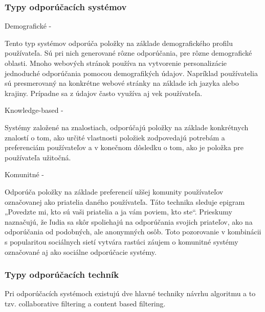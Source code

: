 \subsubsection{Typy odporúčacích systémov}
\begin{itemize}[leftmargin=*]
{\bf \item Demografické - }Tento typ systémov odporúča položky na základe demografického profilu používateľa. Sú pri nich generované rôzne odporúčania, pre rôzne demografické oblasti. Mnoho webových stránok používa na vytvorenie personalizácie jednoduché odporúčania pomocou demografikých údajov. Napríklad používatelia sú presmerovaný na konkrétne webové stránky na základe ich jazyka alebo krajiny. Prípadne sa z údajov často využíva aj vek používateľa.
{\bf \item Knowledge-based - }Systémy založené na znalostiach, odporúčajú položky na základe konkrétnych znalostí o tom, ako určité vlastnosti položiek zodpovedajú potrebám a preferenciám používateľov a v konečnom dôsledku o tom, ako je položka pre používateľa užitočná.
{\bf \item Komunitné - }Odporúča položky na základe preferencií užšej komunity používateľov označovanej ako priatelia daného používateľa. Táto technika sleduje epigram „Povedzte mi, kto sú vaši priatelia a ja vám poviem, kto ste“. Prieskumy naznačujú, že ľudia sa skôr spoliehajú na odporúčania svojich priateľov, ako na odporúčania
od podobných, ale anonymných osôb. Toto pozorovanie v kombinácii s popularitou sociálnych sietí vytvára rastúci záujem o komunitné systémy označované aj ako sociálne odporúčacie systémy. \\
\end{itemize} 
 
\subsubsection{Typy odporúčacích techník}
Pri odporúčacích systémoch existujú dve hlavné techniky návrhu algoritmu a to tzv. collaborative filtering a content based filtering. \\


